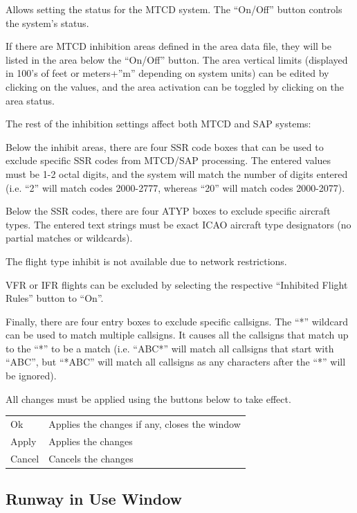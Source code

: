 \documentclass[11pt,a4paper]{memoir}
\begin{document}
Allows setting the status for the MTCD system. The “On/Off” button controls the system’s status.

If there are MTCD inhibition areas defined in the area data file, they will be listed in the area below the “On/Off” button. The area vertical limits (displayed in 100’s of feet or meters+”m” depending on system units) can be edited by clicking on the values, and the area activation can be toggled by clicking on the area status.

The rest of the inhibition settings affect both MTCD and SAP systems:

Below the inhibit areas, there are four SSR code boxes that can be used to exclude specific SSR codes from MTCD/SAP processing. The entered values must be 1-2 octal digits, and the system will match the number of digits entered (i.e. “2” will match codes 2000-2777, whereas “20” will match codes 2000-2077).

Below the SSR codes, there are four ATYP boxes to exclude specific aircraft types. The entered text strings must be exact ICAO aircraft type designators (no partial matches or wildcards).

The flight type inhibit is not available due to network restrictions.

VFR or IFR flights can be excluded by selecting the respective “Inhibited Flight Rules” button to “On”.

Finally, there are four entry boxes to exclude specific callsigns. The “*” wildcard can be used to match multiple callsigns. It causes all the callsigns that match up to the “*” to be a match (i.e. “ABC*” will match all callsigns that start with “ABC”, but “*ABC” will match all callsigns as any characters after the “*” will be ignored).

All changes must be applied using the buttons below to take effect.

\begin{tabular}{l l}
    Ok      & Applies the changes if any, closes the window\\
    Apply   & Applies the changes\\
    Cancel  & Cancels the changes\\
\end{tabular}

\subsection{Runway in Use Window}
\label{win:riuw}
\end{document}
